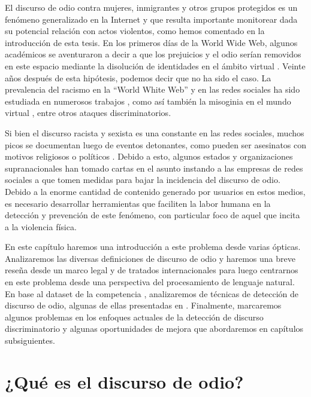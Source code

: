 
\label{chap:04_hate_speech}

El discurso de odio contra mujeres, inmigrantes y otros grupos protegidos es un fenómeno generalizado en la Internet y que resulta importante monitorear dada su potencial relación con actos violentos, como hemos comentado en la introducción de esta tesis. En los primeros días de la World Wide Web, algunos académicos se aventuraron a decir a que los prejuicios y el odio serían removidos en este espacio mediante la disolución de identidades en el ámbito virtual \cite{levy2001cyberculture, rheingold1993virtual}. Veinte años después de esta hipótesis, podemos decir que no ha sido el caso. La prevalencia del racismo en la ``World White Web''  y  en las redes sociales ha sido estudiada en numerosos trabajos \cite{adams2005white, kettrey2014staking}, como así también la misoginia en el mundo virtual \cite{filipovic2007blogging, mantilla2013gendertrolling}, entre otros ataques discriminatorios.

Si bien el discurso racista y sexista es una constante en las redes sociales, muchos picos se documentan luego de eventos detonantes, como pueden ser asesinatos con motivos religiosos o políticos \cite{burnap2015cyber}. Debido a esto, algunos estados y organizaciones supranacionales han tomado cartas en el asunto instando a las empresas de redes sociales a que tomen medidas para bajar la incidencia del discurso de odio. Debido a la enorme cantidad de contenido generado por usuarios en estos medios, es necesario desarrollar herramientas que faciliten la labor humana en la detección y prevención de este fenómeno, con particular foco de aquel que incita a la violencia física.


En este capítulo haremos una introducción a este problema desde varias ópticas. Analizaremos las diversas definiciones de discurso de odio y haremos una breve reseña desde un marco legal y de tratados internacionales para luego centrarnos en este problema desde una perspectiva del procesamiento de lenguaje natural. En base al dataset de la competencia \hateval{} \cite{hateval2019semeval}, analizaremos de técnicas de detección de discurso de odio, algunas de ellas presentadas en \citet{perez-2019-atalaya}. Finalmente, marcaremos algunos problemas en los enfoques actuales de la detección de discurso discriminatorio y algunas oportunidades de mejora que abordaremos en capítulos subsiguientes.


\section{¿Qué es el discurso de odio?}
\label{sec:hate_speech_definitions}

